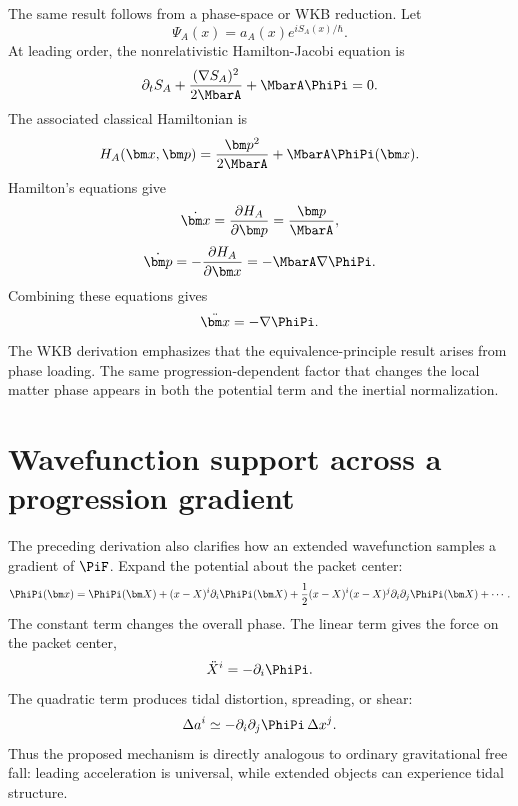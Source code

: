 \documentclass[12pt]{article}
\begin{document}
The same result follows from a phase-space or WKB reduction. Let
\begin{equation}
    \Psi_A(x)=a_A(x)e^{iS_A(x)/\hbar}.
    \label{eq:WKB-ansatz}
\end{equation}
At leading order, the nonrelativistic Hamilton-Jacobi equation is
\begin{equation}
    \partial_t S_A + \frac{(\nabla S_A)^2}{2\MbarA}+\MbarA\PhiPi=0.
    \label{eq:HJ}
\end{equation}
The associated classical Hamiltonian is
\begin{equation}
    H_A(\bm x,\bm p)=\frac{\bm p^2}{2\MbarA}+\MbarA\PhiPi(\bm x).
    \label{eq:classical-H}
\end{equation}
Hamilton's equations give
\begin{equation}
    \dot{\bm x}=\frac{\partial H_A}{\partial \bm p}=\frac{\bm p}{\MbarA},
    \label{eq:hamilton-x}
\end{equation}
\begin{equation}
    \dot{\bm p}=-\frac{\partial H_A}{\partial \bm x}=-\MbarA\nabla\PhiPi.
    \label{eq:hamilton-p}
\end{equation}
Combining these equations gives
\begin{equation}
    \ddot{\bm x}=-\nabla\PhiPi.
    \label{eq:WKB-accel}
\end{equation}
The WKB derivation emphasizes that the equivalence-principle result arises from phase loading. The same progression-dependent factor that changes the local matter phase appears in both the potential term and the inertial normalization.
\section{Wavefunction support across a progression gradient}

The preceding derivation also clarifies how an extended wavefunction samples a gradient of \(\PiF\). Expand the potential about the packet center:
\begin{equation}
    \PhiPi(\bm x)=\PhiPi(\bm X)
    +(x-X)^i\partial_i\PhiPi(\bm X)
    +\frac{1}{2}(x-X)^i(x-X)^j\partial_i\partial_j\PhiPi(\bm X)+\cdots.
    \label{eq:potential-expansion}
\end{equation}
The constant term changes the overall phase. The linear term gives the force on the packet center,
\begin{equation}
    \ddot X^i=-\partial_i\PhiPi.
    \label{eq:linear-force}
\end{equation}
The quadratic term produces tidal distortion, spreading, or shear:
\begin{equation}
    \Delta a^i\simeq -\partial_i\partial_j\PhiPi\,\Delta x^j.
    \label{eq:tidal-accel}
\end{equation}
Thus the proposed mechanism is directly analogous to ordinary gravitational free fall: leading acceleration is universal, while extended objects can experience tidal structure.
\end{document}
